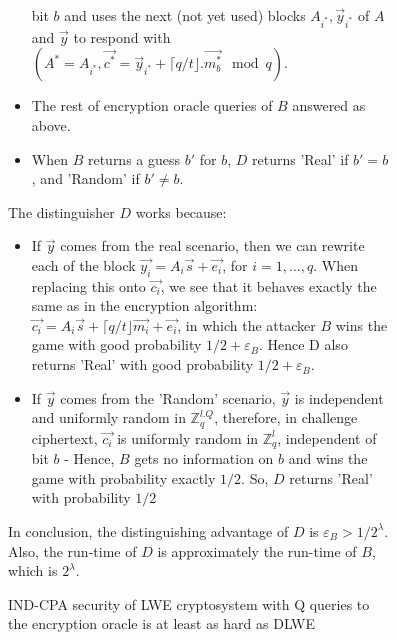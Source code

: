\begin{description}
\begin{description}
\begin{description}
\begin{itemize}
                                bit $b$ and uses the next (not yet used) blocks
                                $A_{i^*}, \vec{y}_{i^*}$ of $A$ and
                                $\vec{y}$ to respond with $(A^* = A_{i^*},
                                \vec{c^*} = \vec{y}_{i^*} + \lceil q/t \rfloor .
                            \vec{m_b^*} \mod q)$.
                        \item The rest of encryption oracle queries of
                            $B$ answered as above.
                        \item When $B$ returns a guess $b'$ for $b$, $D$ returns
                            'Real' if $b' = b$, and 'Random' if $b' \neq b$.
                    \end{itemize}
                    The distinguisher $D$ works because:
                    \begin{itemize}
                        \item If $\vec{y}$ comes from the real scenario, then we
                            can rewrite each of the block $\vec{y_i} =
                            A_i\vec{s} + \vec{e_i}$, for $i = 1,\dots,q$. When
                            replacing this onto $\vec{c_i}$, we see that it
                            behaves exactly the same as in the encryption
                            algorithm: $\vec{c_i} = A_i\vec{s} + \lceil q/t
                            \rfloor \vec{m_i} + \vec{e_i}$, in which the
                            attacker $B$ wins the game with good probability
                            $1/2 + \varepsilon_B$. Hence D also returns 'Real'
                            with good probability $1/2 + \varepsilon_B$.
                        \item If $\vec{y}$ comes from the 'Random' scenario,
                            $\vec{y}$ is independent and uniformly random in
                            $\mathbb{Z}_q^{l.Q}$, therefore, in challenge
                            ciphertext, $\vec{c_i}$ is uniformly random in
                            $\mathbb{Z}_q^l$, independent of bit $b$ - Hence,
                            $B$ gets no information on $b$ and wins the game
                            with probability exactly $1/2$. So, $D$ returns
                            'Real' with probability $1/2$
                    \end{itemize}
                    In conclusion, the distinguishing advantage of $D$ is
                    $\varepsilon_B > 1/2^\lambda$. Also, the run-time of
                    $D$ is approximately the run-time of $B$, which is
                    $2^\lambda$.
                    \begin{theorem}
                        IND-CPA security of LWE cryptosystem with Q queries to the
                        encryption oracle is at least as hard as DLWE
                        \label{theo:reductionCPADLWE}
                    \end{theorem}



\end{description}
\end{description}
\end{description}
